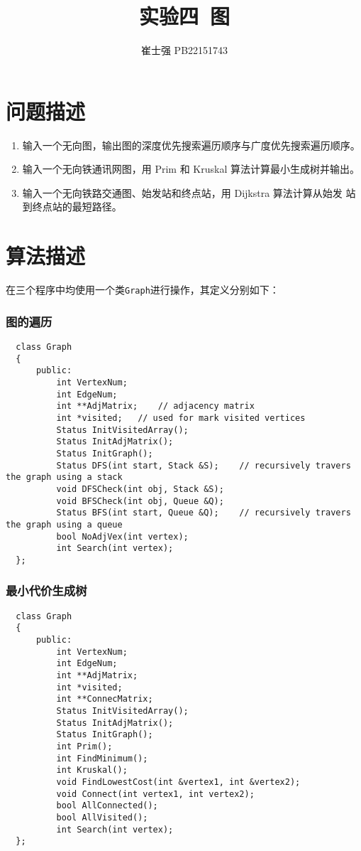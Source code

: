 \documentclass[UTF8]{ctexart}
\title{实验四\ 图}
\author{崔士强 PB22151743}
\date{}
\begin{document}
\maketitle

\section{问题描述}
\begin{enumerate}
  \item 输入一个无向图，输出图的深度优先搜索遍历顺序与广度优先搜索遍历顺序。
  \item 输入一个无向铁通讯网图，用 Prim 和 Kruskal 算法计算最小生成树并输出。
  \item 输入一个无向铁路交通图、始发站和终点站，用 Dijkstra 算法计算从始发
  站到终点站的最短路径。
\end{enumerate}

\section{算法描述}
在三个程序中均使用一个类\lstinline{Graph}进行操作，其定义分别如下：
\subsubsection{图的遍历}
\begin{lstlisting}
  class Graph
  {
      public:
          int VertexNum;
          int EdgeNum;
          int **AdjMatrix;    // adjacency matrix
          int *visited;   // used for mark visited vertices
          Status InitVisitedArray();
          Status InitAdjMatrix();
          Status InitGraph();
          Status DFS(int start, Stack &S);    // recursively travers the graph using a stack
          void DFSCheck(int obj, Stack &S);
          void BFSCheck(int obj, Queue &Q);
          Status BFS(int start, Queue &Q);    // recursively travers the graph using a queue
          bool NoAdjVex(int vertex);
          int Search(int vertex);
  };
\end{lstlisting}
\subsubsection{最小代价生成树}
\begin{lstlisting}
  class Graph
  {
      public:
          int VertexNum;
          int EdgeNum;
          int **AdjMatrix;
          int *visited;
          int **ConnecMatrix;
          Status InitVisitedArray();
          Status InitAdjMatrix();
          Status InitGraph();
          int Prim();
          int FindMinimum();
          int Kruskal();
          void FindLowestCost(int &vertex1, int &vertex2);
          void Connect(int vertex1, int vertex2);
          bool AllConnected();
          bool AllVisited();
          int Search(int vertex);
  };
\end{lstlisting}
\end{document}
